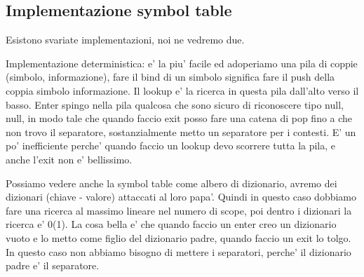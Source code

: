 \subsection{Implementazione symbol table}
Esistono svariate implementazioni, noi ne vedremo due.

Implementazione deterministica: e' la piu' facile ed adoperiamo una pila di coppie (simbolo, informazione), fare il bind di un simbolo significa fare il push della coppia simbolo informazione. Il lookup e' la ricerca in questa pila dall'alto verso il basso. Enter spingo nella pila qualcosa che sono sicuro di riconoscere tipo null, null, in modo tale che quando faccio exit posso fare una catena di pop fino a che non trovo il separatore, sostanzialmente metto un separatore per i contesti. E' un po' inefficiente perche' quando faccio un lookup devo scorrere tutta la pila, e anche l'exit non e' bellissimo.

Possiamo vedere anche la symbol table come albero di dizionario, avremo dei dizionari (chiave - valore) attaccati al loro papa'. Quindi in questo caso dobbiamo fare una ricerca al massimo lineare nel numero di scope, poi dentro i dizionari la ricerca e'  0(1). La cosa bella e' che quando faccio un enter creo un dizionario vuoto e lo metto come figlio del dizionario padre, quando faccio un exit lo tolgo. In questo caso non abbiamo bisogno di mettere i separatori, perche' il dizionario padre e' il separatore.